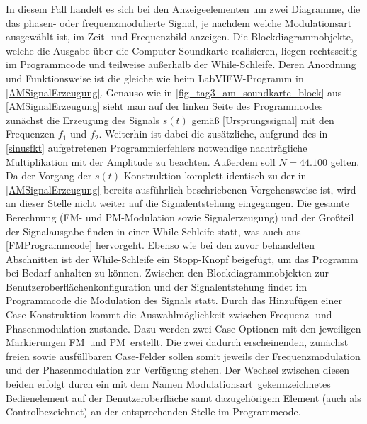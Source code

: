 \documentclass[
a4paper,
12pt,
pagesize,
ngerman
]{scrartcl}
\begin{document}
	\noindent In diesem Fall handelt es sich bei den Anzeigeelementen um zwei Diagramme, die das phasen- oder frequenzmodulierte Signal, je nachdem welche Modulationsart ausgewählt ist, im Zeit- und Frequenzbild anzeigen. 
	Die Blockdiagrammobjekte, welche die Ausgabe über die Computer-Soundkarte realisieren, liegen rechtsseitig im Programmcode und teilweise außerhalb der While-Schleife. 
	Deren Anordnung und Funktionsweise ist die gleiche wie beim LabVIEW-Programm in \cref{AMSignalErzeugung}. 
	Genauso wie in \cref{fig_tag3_am_soundkarte_block} aus \cref{AMSignalErzeugung} sieht man auf der linken Seite des Programmcodes zunächst die Erzeugung des Signals $s(t)$ gemäß \cref{Ursprungssignal} mit den Frequenzen $f_1$ und $f_2$. 
	Weiterhin ist dabei die zusätzliche, aufgrund des in \cref{sinusfkt} aufgetretenen Programmierfehlers notwendige nachträgliche Multiplikation mit der Amplitude zu beachten. 
	Außerdem soll $N = 44.100$ gelten. 
	Da der Vorgang der $s(t)$-Konstruktion komplett identisch zu der in \cref{AMSignalErzeugung} bereits ausführlich beschriebenen Vorgehensweise ist, wird an dieser Stelle nicht weiter auf die Signalentstehung eingegangen. 
	Die gesamte Berechnung (FM- und PM-Modulation sowie Signalerzeugung) und der Großteil der Signalausgabe finden in einer While-Schleife statt, was auch aus \cref{FMProgrammcode} hervorgeht.
	Ebenso wie bei den zuvor behandelten Abschnitten ist der While-Schleife ein \glqq Stopp\grqq -Knopf beigefügt, um das Programm bei Bedarf anhalten zu können.
	Zwischen den Blockdiagrammobjekten zur Benutzeroberflächenkonfiguration und der Signalentstehung findet im Programmcode die Modulation des Signals statt.
	Durch das Hinzufügen einer Case-Konstruktion kommt die Auswahlmöglichkeit zwischen Frequenz- und Phasenmodulation zustande. %
	Dazu werden zwei Case-Optionen mit den jeweiligen Markierungen \glqq FM\grqq\ und \glqq PM\grqq\ erstellt. 
	Die zwei dadurch erscheinenden, zunächst freien sowie ausfüllbaren Case-Felder sollen somit jeweils der Frequenzmodulation und der Phasenmodulation zur Verfügung stehen. %
	Der Wechsel zwischen diesen beiden erfolgt durch ein mit dem Namen \glqq Modulationsart\grqq\ gekennzeichnetes Bedienelement auf der Benutzeroberfläche samt dazugehörigem Element (auch als \glqq Control\grqq bezeichnet) an der entsprechenden Stelle im Programmcode.
		
\end{document}
